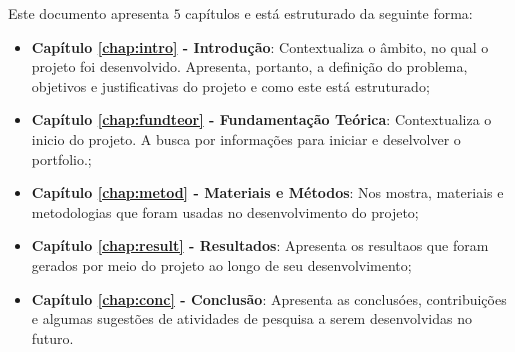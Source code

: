 Este documento apresenta $5$ capítulos e está estruturado da seguinte forma:

\begin{itemize}

  \item \textbf{Capítulo \ref{chap:intro} - Introdução}: Contextualiza o âmbito, no qual o projeto foi desenvolvido. Apresenta, portanto, a definição do problema, objetivos e justificativas do projeto e como este \thetypeworkthree está estruturado;
  \item \textbf{Capítulo \ref{chap:fundteor} - Fundamentação Teórica}: Contextualiza o inicio do projeto. A busca por informações para iniciar e deselvolver o portfolio.;
  \item \textbf{Capítulo \ref{chap:metod} - Materiais e Métodos}: Nos mostra, materiais e metodologias que foram usadas no desenvolvimento do projeto;
  \item \textbf{Capítulo \ref{chap:result} - Resultados}: Apresenta os resultaos que foram gerados por meio do projeto ao longo de seu desenvolvimento;
  \item \textbf{Capítulo \ref{chap:conc} - Conclusão}: Apresenta as conclusóes, contribuições e algumas sugestões de atividades de pesquisa a serem desenvolvidas no futuro.

\end{itemize}
